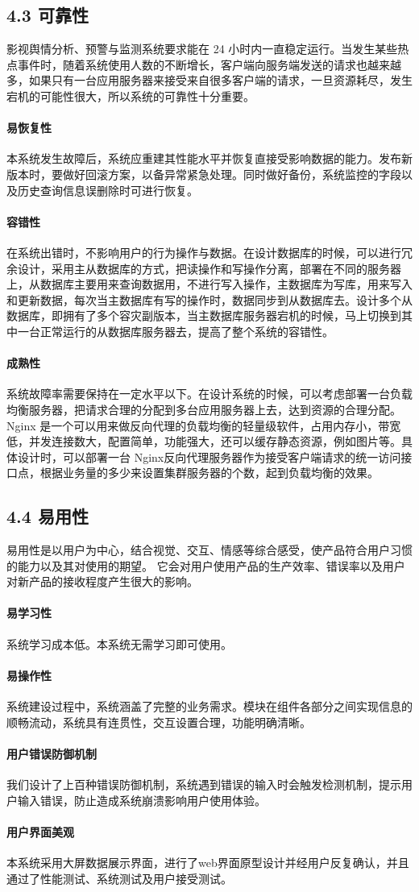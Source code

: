 \subsection{4.3 可靠性}
影视舆情分析、预警与监测系统要求能在 24 小时内一直稳定运行。当发生某些热点事件时，随着系统使用人数的不断增长，客户端向服务端发送的请求也越来越多，如果只有一台应用服务器来接受来自很多客户端的请求，一旦资源耗尽，发生宕机的可能性很大，所以系统的可靠性十分重要。
\paragraph{易恢复性}
本系统发生故障后，系统应重建其性能水平并恢复直接受影响数据的能力。发布新版本时，要做好回滚方案，以备异常紧急处理。同时做好备份，系统监控的字段以及历史查询信息误删除时可进行恢复。
\paragraph{容错性}
在系统出错时，不影响用户的行为操作与数据。在设计数据库的时候，可以进行冗余设计，采用主从数据库的方式，把读操作和写操作分离，部署在不同的服务器上，从数据库主要用来查询数据用，不进行写入操作，主数据库为写库，用来写入和更新数据，每次当主数据库有写的操作时，数据同步到从数据库去。设计多个从数据库，即拥有了多个容灾副版本，当主数据库服务器宕机的时候，马上切换到其中一台正常运行的从数据库服务器去，提高了整个系统的容错性。
\paragraph{成熟性}
系统故障率需要保持在一定水平以下。在设计系统的时候，可以考虑部署一台负载均衡服务器，把请求合理的分配到多台应用服务器上去，达到资源的合理分配。Nginx 是一个可以用来做反向代理的负载均衡的轻量级软件，占用内存小，带宽低，并发连接数大，配置简单，功能强大，还可以缓存静态资源，例如图片等。具体设计时，可以部署一台 Nginx反向代理服务器作为接受客户端请求的统一访问接口点，根据业务量的多少来设置集群服务器的个数，起到负载均衡的效果。

\subsection{4.4 易用性}
易用性是以用户为中心，结合视觉、交互、情感等综合感受，使产品符合用户习惯的能力以及其对使用的期望。 它会对用户使用产品的生产效率、错误率以及用户对新产品的接收程度产生很大的影响。
\paragraph{易学习性}
系统学习成本低。本系统无需学习即可使用。
\paragraph{易操作性}
系统建设过程中，系统涵盖了完整的业务需求。模块在组件各部分之间实现信息的顺畅流动，系统具有连贯性，交互设置合理，功能明确清晰。
\paragraph{用户错误防御机制}
我们设计了上百种错误防御机制，系统遇到错误的输入时会触发检测机制，提示用户输入错误，防止造成系统崩溃影响用户使用体验。
\paragraph{用户界面美观}
本系统采用大屏数据展示界面，进行了web界面原型设计并经用户反复确认，并且通过了性能测试、系统测试及用户接受测试。


